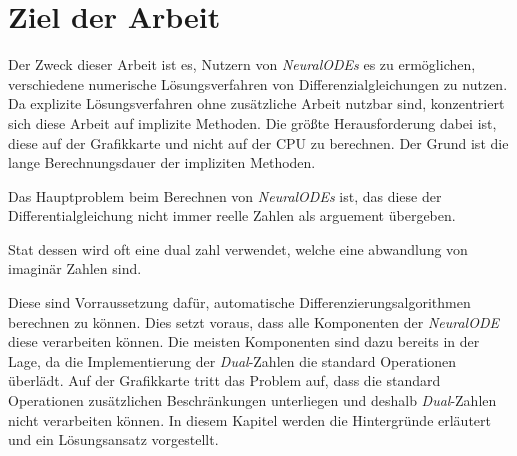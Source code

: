 
\section{Ziel der Arbeit} \label{sec:ziel_der_arbeit}

Der Zweck dieser Arbeit ist es, Nutzern von \textit{NeuralODEs} \cite{neuralode} es zu ermöglichen, 
verschiedene numerische Lösungsverfahren von Differenzialgleichungen zu nutzen.
Da explizite Lösungsverfahren ohne zusätzliche Arbeit nutzbar sind,
konzentriert sich diese Arbeit auf implizite Methoden.
Die größte Herausforderung dabei ist, 
diese auf der Grafikkarte und nicht auf der CPU zu berechnen.
Der Grund ist die lange Berechnungsdauer der impliziten Methoden.



Das Hauptproblem beim Berechnen von \textit{NeuralODEs} ist, das diese der Differentialgleichung nicht immer reelle Zahlen als arguement übergeben.

Stat dessen wird oft eine dual zahl verwendet, welche eine abwandlung von 
imaginär Zahlen sind.

Diese sind Vorraussetzung dafür, 
automatische Differenzierungsalgorithmen berechnen zu können.
Dies setzt voraus, dass alle Komponenten der \textit{NeuralODE}\cite{neuralode} diese verarbeiten können.
Die meisten Komponenten sind dazu bereits in der Lage, 
da die Implementierung der \textit{Dual}-Zahlen
die standard Operationen überlädt.
Auf der Grafikkarte tritt das Problem auf, dass die standard Operationen 
zusätzlichen Beschränkungen unterliegen 
und deshalb \textit{Dual}-Zahlen nicht verarbeiten können.
In diesem Kapitel werden die Hintergründe erläutert und ein Lösungsansatz vorgestellt.

